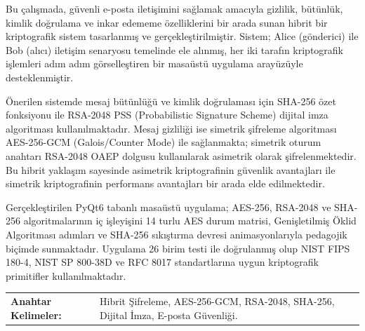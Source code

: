 

Bu çalışmada, güvenli e-posta iletişimini sağlamak amacıyla gizlilik, bütünlük, kimlik doğrulama ve inkar edememe özelliklerini bir arada sunan hibrit bir kriptografik sistem tasarlanmış ve gerçekleştirilmiştir. Sistem; Alice (gönderici) ile Bob (alıcı) iletişim senaryosu temelinde ele alınmış, her iki tarafın kriptografik işlemleri adım adım görselleştiren bir masaüstü uygulama arayüzüyle desteklenmiştir.

Önerilen sistemde mesaj bütünlüğü ve kimlik doğrulaması için SHA-256 özet fonksiyonu ile RSA-2048 PSS (Probabilistic Signature Scheme) dijital imza algoritması kullanılmaktadır. Mesaj gizliliği ise simetrik şifreleme algoritması AES-256-GCM (Galois/Counter Mode) ile sağlanmakta; simetrik oturum anahtarı RSA-2048 OAEP dolgusu kullanılarak asimetrik olarak şifrelenmektedir. Bu hibrit yaklaşım sayesinde asimetrik kriptografinin güvenlik avantajları ile simetrik kriptografinin performans avantajları bir arada elde edilmektedir.

Gerçekleştirilen PyQt6 tabanlı masaüstü uygulama; AES-256, RSA-2048 ve SHA-256 algoritmalarının iç işleyişini 14 turlu AES durum matrisi, Genişletilmiş Öklid Algoritması adımları ve SHA-256 sıkıştırma devresi animasyonlarıyla pedagojik biçimde sunmaktadır. Uygulama 26 birim testi ile doğrulanmış olup NIST FIPS 180-4, NIST SP 800-38D ve RFC 8017 standartlarına uygun kriptografik primitifler kullanılmaktadır.

\vspace{3mm}

 \begin{tabular}{ll}
{\textbf{Anahtar Kelimeler:}} & 
{Hibrit Şifreleme, AES-256-GCM, RSA-2048, SHA-256, Dijital İmza, E-posta Güvenliği.} 	 
 \end{tabular} 

